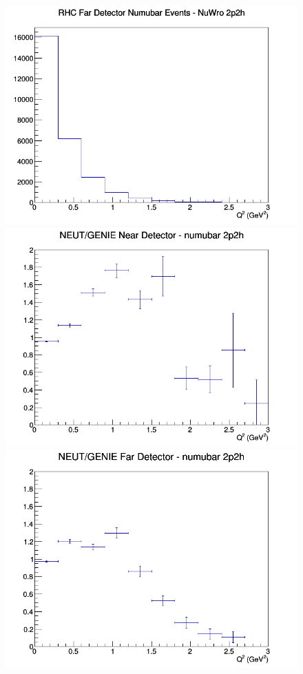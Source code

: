 \begin{figure}[h]
\endminipage
{}
\includegraphics[width=\linewidth]{eff_Q2/GAr/2p2h_RHC_FD_numubar_Q2_NuWro.png}
\endminipage
\newline
{}
\includegraphics[width=\linewidth]{eff_Q2/GAr/ratios/2p2h_NEUT_GENIE_numubar_near_Q2.png}
\endminipage
{}
\includegraphics[width=\linewidth]{eff_Q2/GAr/ratios/2p2h_NEUT_GENIE_numubar_far_Q2.png}

\end{figure}
